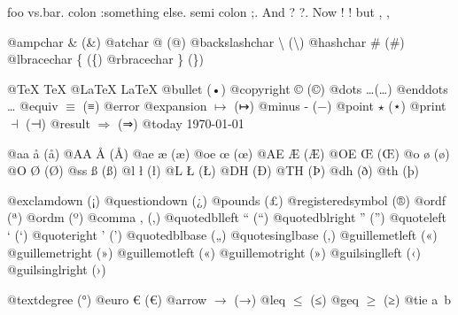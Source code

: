 \documentclass{book}
\renewcommand{\_}{\Texinfounderscore\discretionary{}{}{}}
\begin{document}
\begin{titlepage}
foo vs.\@ bar. 
colon :\@And something else.
semi colon ;\@.
And ? ?\@.
Now ! !\@@
but , ,\@

@ampchar \& (\&)
@atchar @ (@)
@backslashchar \textbackslash{} (\textbackslash{})
@hashchar \# (\#)
@lbracechar \{ (\{)
@rbracechar \} (\})

@TeX \TeX{}
@LaTeX \LaTeX{}
@bullet \textbullet{} (•)
@copyright \copyright{} (©)
@dots \dots{}\@ (…)
@enddots \dots{}
@equiv $\equiv{}$ (≡)
@error 
@expansion $\mapsto{}$ (↦)
@minus - (−)
@point $\star{}$ (⋆)
@print $\dashv{}$ (⊣)
@result $\Rightarrow{}$ (⇒)
@today \today{}

@aa \aa{} (å)
@AA \AA{} (Å)
@ae \ae{} (æ)
@oe \oe{} (œ)
@AE \AE{} (Æ)
@OE \OE{} (Œ)
@o \o{} (ø)
@O \O{} (Ø)
@ss \ss{} (ß)
@l \l{} (ł)
@L \L{} (Ł)
@DH \DH{} (Ð)
@TH \TH{} (Þ)
@dh \dh{} (ð)
@th \th{} (þ)

@exclamdown \textexclamdown{} (¡)
@questiondown \textquestiondown{} (¿)
@pounds \textsterling{} (£)
@registeredsymbol \circledR{} (®)
@ordf \textordfeminine{} (ª)
@ordm \textordmasculine{} (º)
@comma , (,)
@quotedblleft \textquotedblleft{} (“)
@quotedblright \textquotedblright{} (”)
@quoteleft \textquoteleft{} (‘)
@quoteright \textquoteright{} (’)
@quotedblbase \quotedblbase{} („)
@quotesinglbase \quotesinglbase{} (‚)
@guillemetleft \guillemotleft{} («)
@guillemetright \guillemotright{} (»)
@guillemotleft \guillemotleft{} («)
@guillemotright \guillemotright{} (»)
@guilsinglleft \guilsinglleft{} (‹)
@guilsinglright \guilsinglright{} (›)

@textdegree \textdegree{} (°)
@euro \euro{} (€)
@arrow $\rightarrow{}$ (→)
@leq $\leq{}$ (≤)
@geq $\geq{}$ (≥)
@tie a~b


\end{titlepage}
\end{document}
